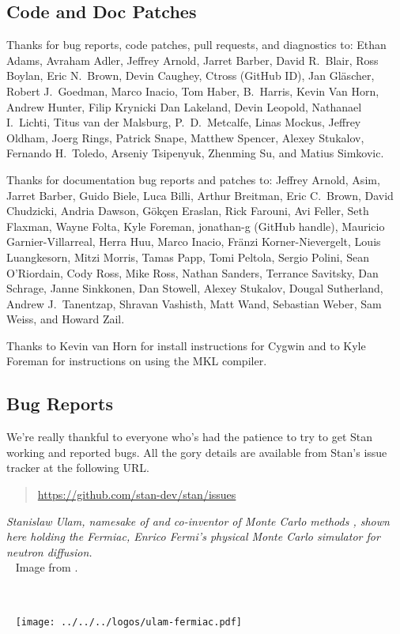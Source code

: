 \subsection*{Code  and Doc Patches}

Thanks for bug reports, code patches, pull requests, and diagnostics
to: 
Ethan Adams, 
Avraham Adler,
Jeffrey Arnold, 
Jarret Barber, 
David R.~Blair, 
Ross Boylan, 
Eric N.~Brown, 
Devin Caughey, 
Ctross (GitHub ID), 
Jan Gl\"ascher,
Robert J.\ Goedman, 
Marco Inacio, 
Tom Haber,
B.~Harris, 
Kevin Van Horn, 
Andrew Hunter, 
Filip Krynicki
Dan Lakeland, 
Devin Leopold, 
Nathanael I.~Lichti,
Titus van der Malsburg,
P.~D.~Metcalfe, 
Linas Mockus,
Jeffrey Oldham, 
Joerg Rings,
Patrick Snape,
Matthew Spencer,
Alexey Stukalov,
Fernando H.~Toledo, 
Arseniy Tsipenyuk,
Zhenming Su,
and Matius Simkovic.

Thanks for documentation bug reports and patches to: 
Jeffrey Arnold,
Asim, 
Jarret Barber, 
Guido Biele,
Luca Billi, 
Arthur Breitman,
Eric C.~Brown, 
David Chudzicki,
Andria Dawson, 
G\"{o}k\c{c}en Eraslan,
Rick Farouni,
Avi Feller,
Seth Flaxman, 
Wayne Folta, 
Kyle Foreman,
jonathan-g (GitHub handle),
Mauricio Garnier-Villarreal,
Herra Huu,
Marco Inacio, 
Fr\"anzi Korner-Nievergelt,
Louis Luangkesorn, 
Mitzi Morris,
Tamas Papp, 
Tomi Peltola,
Sergio Polini,
Sean O'Riordain, 
Cody Ross, 
Mike Ross, 
Nathan Sanders, 
Terrance Savitsky,
Dan Schrage,
Janne Sinkkonen, 
Dan Stowell, 
Alexey Stukalov,
Dougal Sutherland, 
Andrew J.~Tanentzap,
Shravan Vashisth, 
Matt Wand,
Sebastian Weber, 
Sam Weiss, and
Howard Zail.

Thanks to Kevin van Horn for install instructions for Cygwin and to
Kyle Foreman for instructions on using the MKL compiler.


\subsection*{Bug Reports}

We're really thankful to everyone who's had the patience to try
to get Stan working and reported bugs.  All the gory details are
available from Stan's issue tracker at the following URL.
%
\begin{quote}
\url{https://github.com/stan-dev/stan/issues}
\end{quote}




\vfill
\begin{center}
\hfill
\begin{minipage}[b]{2in}
  \footnotesize {\it Stanislaw Ulam, namesake of \Stan and co-inventor
    of Monte Carlo methods \citep{MetropolisUlam:1949}, shown here
    holding the Fermiac, Enrico Fermi's physical Monte Carlo simulator
    for neutron diffusion.}
  \\[3pt] \mbox{ } \hfill
  {\scriptsize Image from \citep{Giesler:2000}.}
\end{minipage} \ \ \ \ \ 
\begin{minipage}[b]{1.5in} \mbox{ } \hfill
  \texttt{[image: ../../../logos/ulam-fermiac.pdf]}
\end{minipage} 
\end{center}
